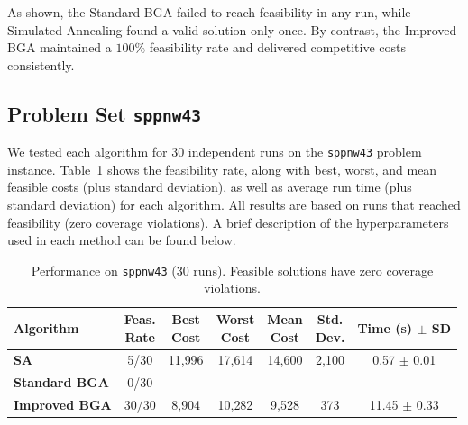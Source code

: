 \documentclass[12pt]{article}
\begin{document}
\noindent
As shown, the Standard BGA failed to reach feasibility in any run, while Simulated Annealing found a valid solution only once. By contrast, the Improved BGA maintained a $100\%$ feasibility rate and delivered competitive costs consistently.

\subsection{Problem Set \texttt{sppnw43}}
\label{subsec:sppnw43}

We tested each algorithm for 30 independent runs on the \texttt{sppnw43} problem instance. 
Table~\ref{tab:sppnw43} shows the feasibility rate, along with best, worst, and mean feasible costs (plus standard deviation), as well as average run time (plus standard deviation) for each algorithm. 
All results are based on runs that reached feasibility (zero coverage violations). 
A brief description of the hyperparameters used in each method can be found below.

\vspace{1em}

\begin{table}[htbp]
  \centering
  \label{tab:sppnw43}
  \renewcommand{\arraystretch}{1.1}
  \begin{tabular}{lcccccc}
    \hline
    \textbf{Algorithm} 
      & \makecell{Feas.\\Rate} 
      & \makecell{Best\\Cost} 
      & \makecell{Worst\\Cost} 
      & \makecell{Mean\\Cost} 
      & \makecell{Std.\\Dev.} 
      & \makecell{Time\\(s) $\pm$ SD}\\
    \hline
    \textbf{SA}          
      & 5/30
      & 11{,}996
      & 17{,}614
      & 14{,}600
      & 2{,}100
      & 0.57 $\pm$ 0.01 \\
    \textbf{Standard BGA} 
      & 0/30 
      & — 
      & —
      & —
      & —
      & — \\
    \textbf{Improved BGA} 
      & 30/30 
      & 8{,}904
      & 10{,}282
      & 9{,}528
      & 373
      & 11.45 $\pm$ 0.33 \\
    \hline
  \end{tabular}
  \caption{Performance on \texttt{sppnw43} (30 runs). Feasible solutions have zero coverage violations.}
\end{table}
\end{document}
